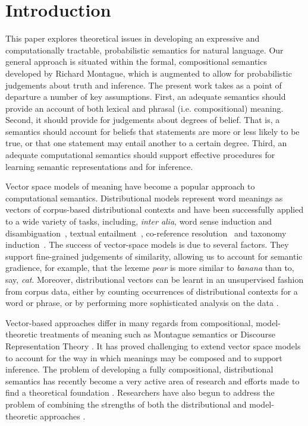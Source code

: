 \documentclass[manuscript]{clv2}
\begin{document}
\section{Introduction}

This paper explores theoretical  issues in developing an expressive and computationally tractable, probabilistic semantics for natural language.  Our general approach is situated within the formal, compositional semantics developed by Richard Montague, which is augmented to allow for probabilistic judgements about truth and inference. The present work takes  as a point of departure a number of key assumptions.
First, an adequate semantics should provide an account of both lexical and phrasal (i.e. compositional) meaning. Second, it should provide for judgements about degrees of belief. That is, a semantics should account for beliefs that statements are more or less likely to be true, or that one statement may entail another to a certain degree. Third, an adequate computational semantics should support effective procedures for learning semantic representations and for inference.

Vector space models of meaning have become a popular approach to computational semantics.
Distributional models represent word meanings as vectors of corpus-based distributional contexts and have been successfully applied to a wide variety of tasks, including, {\em inter alia\/}, word sense induction and disambiguation~\cite{khapra-EtAl:2010:ACL,Baskaya:13}, 
textual entailment~\cite{Marelli:14}, 
co-reference resolution~\cite{lee-EtAl:2012:EMNLP-CoNLL}
and taxonomy induction~\cite{fountain-lapata:2012:NAACL-HLT}. 
The success of vector-space models is due to several factors. They support fine-grained judgements of similarity, allowing us to account for semantic gradience, for example, that the lexeme {\em pear} is more similar to {\em banana}  than to, say, {\em cat}. Moreover, distributional vectors can be learnt in an unsupervised fashion from corpus data, either by counting occurrences of distributional contexts for a word or phrase, or by performing more sophisticated analysis on the data \cite{Mikolov:13,Pennington:14}. 

Vector-based approaches differ in many regards from compositional, model-theoretic treatments of meaning such as Montague semantics or Discourse Representation Theory \cite{Kamp:93}. It has proved challenging to extend vector space models to account for the way in which meanings may be composed and to support inference. The problem of developing a fully compositional, distributional semantics has recently become a very active area of research  \cite{Widdows:08,Mitchell:08,Baroni2010,Garrette:11,Grefenstette:11,Socher:12,Lewis:13} and efforts made to find a theoretical foundation \cite{Clarke:12,Kartsaklis:14}.  Researchers have also begun to address the problem of combining the strengths of both the distributional and model-theoretic approaches \cite{Clarke:07,Coecke:10,Garrette:11,Lewis:13}. 
\end{document}
